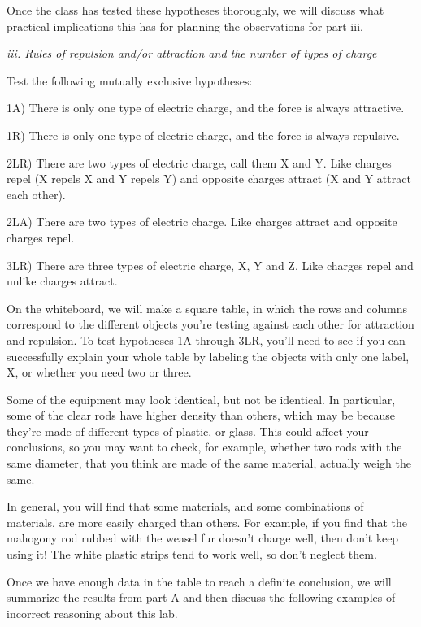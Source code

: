 Once the class has tested these hypotheses thoroughly,
we will discuss what practical implications this has for
planning the observations for part iii.

\emph{iii. Rules of repulsion and/or attraction and the
number of types of charge}

Test the following mutually exclusive hypotheses:

1A) There is only one type of electric charge, and the force
is always attractive.

1R) There is only one type of electric charge, and the force
is always repulsive.

2LR) There are two types of electric charge, call them X
and Y. Like charges repel (X repels X and Y repels Y)
and opposite charges attract (X and Y attract each other).

2LA) There are two types of electric charge. Like charges
attract and opposite charges repel.

3LR) There are three types of electric charge, X, Y and
Z. Like charges repel and unlike charges attract.

On the whiteboard, we will
make a square table, in which the rows and columns correspond
to the different objects you're testing against each other
for attraction and repulsion. To test hypotheses 1A through 3LR, you'll
need to see if you can successfully explain your whole
table by labeling the objects with only one label, X,
or whether you need two or three.

Some of the equipment may look identical, but not be identical.
In particular, some of the clear rods have higher density than
others, which may be because they're made of different types of plastic,
or glass. This could affect your conclusions, so you may want to
check, for example, whether two rods with the same diameter,
that you think are made of
the same material, actually weigh the same.

In general, you will find that some materials, and some combinations
of materials, are more easily charg\-ed than others. For example, if
you find that the mahogony rod rubbed with the weasel fur doesn't
charge well, then don't keep using it! The white plastic strips
tend to work well, so don't neglect them.

Once we have enough data in the table to reach a definite conclusion,
we will summarize the results from part A and then
discuss the following examples of incorrect reasoning about this
lab. 

